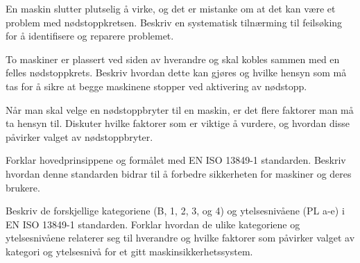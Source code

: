 \documentclass[12pt,a4paper]{article}
\def\oppgave{
		}
\begin{document}
\oppgave{}%
\vskip 5pt 
En maskin slutter plutselig å virke, og det er mistanke om at det kan være et problem med nødstoppkretsen. Beskriv en systematisk tilnærming til feilsøking for å identifisere og reparere problemet.
\vskip 1cm
\oppgave{}%
\vskip 5pt 
To maskiner er plassert ved siden av hverandre og skal kobles sammen med en felles nødstoppkrets. Beskriv hvordan dette kan gjøres og hvilke hensyn som må tas for å sikre at begge maskinene stopper ved aktivering av nødstopp.
\vskip 1cm
\oppgave{}%
\vskip 5pt 
Når man skal velge en nødstoppbryter til en maskin, er det flere faktorer man må ta hensyn til. Diskuter hvilke faktorer som er viktige å vurdere, og hvordan disse påvirker valget av nødstoppbryter.
\vskip 1cm
\oppgave{}%
\vskip 5pt 
Forklar hovedprinsippene og formålet med EN ISO 13849-1 standarden. Beskriv hvordan denne standarden bidrar til å forbedre sikkerheten for maskiner og deres brukere.
\vskip 1cm
\oppgave{}%
\vskip 5pt 
Beskriv de forskjellige kategoriene (B, 1, 2, 3, og 4) og ytelsesnivåene (PL a-e) i EN ISO 13849-1 standarden. Forklar hvordan de ulike kategoriene og ytelsesnivåene relaterer seg til hverandre og hvilke faktorer som påvirker valget av kategori og ytelsesnivå for et gitt maskinsikkerhetssystem.
\end{document}
